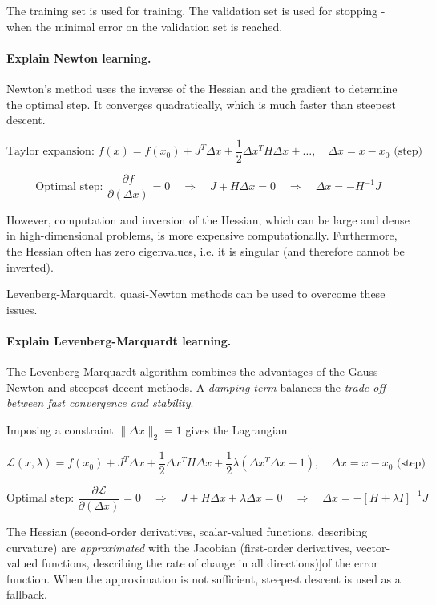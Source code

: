 The training set is used for training.
The validation set is used for stopping - when the minimal error on the validation set is reached.

\paragraph{Explain Newton learning.}

Newton's method uses the inverse of the Hessian and the gradient to determine the optimal step.
It converges quadratically, which is much faster than steepest descent.

$$
\text{Taylor expansion: } f(x) = f(x_0) + J^T \Delta x + \frac{1}{2} \Delta x ^T H \Delta x + \dots,
\quad \Delta x = x - x_0 \text{ (step) }
$$

$$
\text{Optimal step: } \frac{\partial f}{\partial (\Delta x)} = 0
\quad \Rightarrow \quad
J + H \Delta x = 0
\quad \Rightarrow \quad
\Delta x = - H^{-1} J
$$

However, computation and inversion of the Hessian, which can be large and dense in high-dimensional problems,
is more expensive computationally.
Furthermore, the Hessian often has zero eigenvalues, i.e. it is singular (and therefore cannot be inverted).

Levenberg-Marquardt, quasi-Newton methods can be used to overcome these issues.

\paragraph{Explain Levenberg-Marquardt learning.}

The Levenberg-Marquardt algorithm combines the advantages of the
Gauss-Newton and steepest decent methods.
A \textit{damping term} balances the \textit{trade-off between fast convergence and stability}.

Imposing a constraint $\lVert \Delta x \rVert_2 = 1$ gives the Lagrangian

$$
\mathcal{L}(x, \lambda) = f(x_0) + J^T \Delta x + \frac{1}{2} \Delta x ^T H \Delta x + \frac{1}{2} \lambda ( \Delta x ^T \Delta x - 1 ),
\quad \Delta x = x - x_0 \text{ (step) }
$$

$$
\text{Optimal step: } \frac{\partial \mathcal{L}}{\partial (\Delta x)} = 0
\quad \Rightarrow \quad
J + H \Delta x + \lambda \Delta x = 0
\quad \Rightarrow \quad
\Delta x = - [H + \lambda I]^{-1} J
$$

The Hessian (second-order derivatives, scalar-valued functions, describing curvature) are \textit{approximated} with
the Jacobian (first-order derivatives, vector-valued functions, describing the rate of change in all directions)]of the error function.
When the approximation is not sufficient, steepest descent is used as a fallback.

